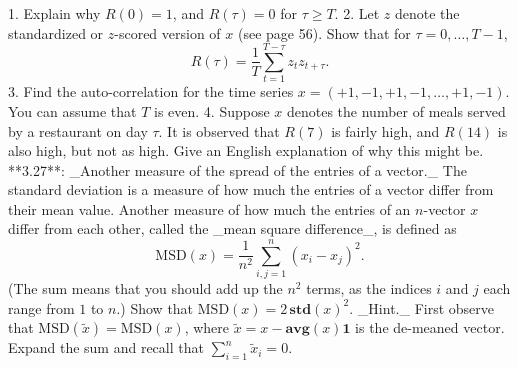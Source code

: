 1. Explain why \(R(0)=1\), and \(R(\tau)=0\) for \(\tau\geq T\).
2. Let \(z\) denote the standardized or \(z\)-scored version of \(x\) (see page 56). Show that for \(\tau=0,\ldots,T-1\), \[R(\tau)=\frac{1}{T}\sum_{t=1}^{T-\tau}z_{t}z_{t+\tau}.\] 3. Find the auto-correlation for the time series \(x=(+1,-1,+1,-1,\ldots,+1,-1)\). You can assume that \(T\) is even.
4. Suppose \(x\) denotes the number of meals served by a restaurant on day \(\tau\). It is observed that \(R(7)\) is fairly high, and \(R(14)\) is also high, but not as high. Give an English explanation of why this might be.
**3.27**: _Another measure of the spread of the entries of a vector._ The standard deviation is a measure of how much the entries of a vector differ from their mean value. Another measure of how much the entries of an \(n\)-vector \(x\) differ from each other, called the _mean square difference_, is defined as \[\mathrm{MSD}(x)=\frac{1}{n^{2}}\sum_{i,j=1}^{n}(x_{i}-x_{j})^{2}.\] (The sum means that you should add up the \(n^{2}\) terms, as the indices \(i\) and \(j\) each range from \(1\) to \(n\).) Show that \(\mathrm{MSD}(x)=2\,\mathbf{std}(x)^{2}\). _Hint._ First observe that \(\mathrm{MSD}(\tilde{x})=\mathrm{MSD}(x)\), where \(\tilde{x}=x-\mathbf{avg}(x)\mathbf{1}\) is the de-meaned vector. Expand the sum and recall that \(\sum_{i=1}^{n}\tilde{x}_{i}=0\).


